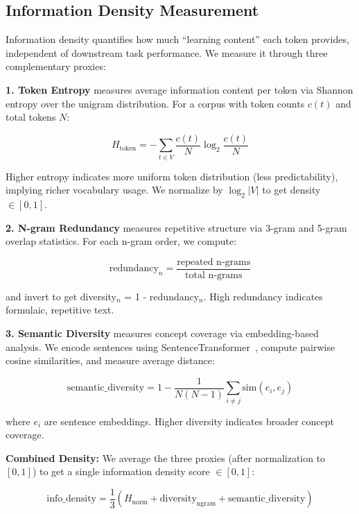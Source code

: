 \subsection{Information Density Measurement}

Information density quantifies how much ``learning content'' each token provides, independent of downstream task performance. We measure it through three complementary proxies:

\textbf{1. Token Entropy} measures average information content per token via Shannon entropy over the unigram distribution. For a corpus with token counts $c(t)$ and total tokens $N$:

\begin{equation}
H_{\text{token}} = -\sum_{t \in V} \frac{c(t)}{N} \log_2 \frac{c(t)}{N}
\end{equation}

Higher entropy indicates more uniform token distribution (less predictability), implying richer vocabulary usage. We normalize by $\log_2|V|$ to get density $\in [0,1]$.

\textbf{2. N-gram Redundancy} measures repetitive structure via 3-gram and 5-gram overlap statistics. For each n-gram order, we compute:

\begin{equation}
\text{redundancy}_n = \frac{\text{repeated n-grams}}{\text{total n-grams}}
\end{equation}

and invert to get diversity$_n$ = 1 - redundancy$_n$. High redundancy indicates formulaic, repetitive text.

\textbf{3. Semantic Diversity} measures concept coverage via embedding-based analysis. We encode sentences using SentenceTransformer~\cite{reimers2019sentence}, compute pairwise cosine similarities, and measure average distance:

\begin{equation}
\text{semantic\_diversity} = 1 - \frac{1}{N(N-1)} \sum_{i \neq j} \text{sim}(e_i, e_j)
\end{equation}

where $e_i$ are sentence embeddings. Higher diversity indicates broader concept coverage.

\textbf{Combined Density:} We average the three proxies (after normalization to $[0,1]$) to get a single information density score $\in [0,1]$:

\begin{equation}
\text{info\_density} = \frac{1}{3}(H_{\text{norm}} + \text{diversity}_{\text{ngram}} + \text{semantic\_diversity})
\end{equation}

